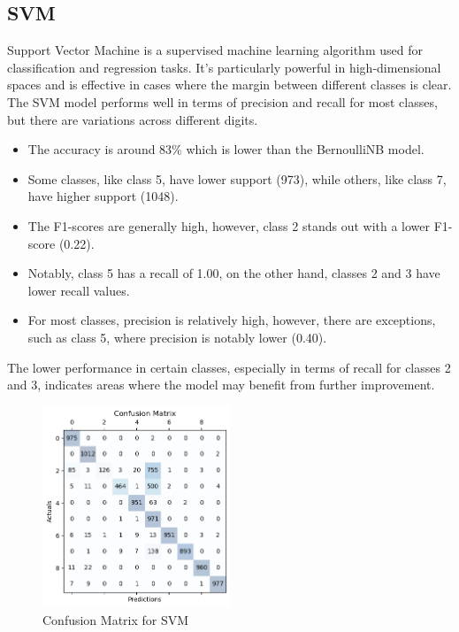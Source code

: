 \documentclass{article}
\begin{document}
\begin{titlepage}
  \section{SVM}
  Support Vector Machine is a supervised machine learning algorithm used for classification and regression tasks. It's particularly powerful in high-dimensional spaces and is effective in cases where the margin between different classes is clear.
  \newline
  \newline
  The SVM model performs well in terms of precision and recall for most classes, but there are variations across different digits.

  \begin{itemize}
    \item The accuracy is around 83\% which is lower than the BernoulliNB model.
    \item Some classes, like class 5, have lower support (973), while others, like class 7, have higher support (1048).
    \item The F1-scores are generally high, however, class 2 stands out with a lower F1-score (0.22).
    \item Notably, class 5 has a recall of 1.00, on the other hand, classes 2 and 3 have lower recall values.
    \item For most classes, precision is relatively high, however, there are exceptions, such as class 5, where precision is notably lower (0.40).
  \end{itemize}

  The lower performance in certain classes, especially in terms of recall for classes 2 and 3, indicates areas where the model may benefit from further improvement.

  \begin{figure}[htbp]
    \centering
    \includegraphics[width=0.5\textwidth]{SVMCM.png}
    \caption{Confusion Matrix for SVM}
    \label{fig:sample2}
  \end{figure}

\end{titlepage}
\end{document}
